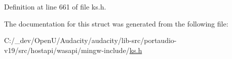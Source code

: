 Definition at line 661 of file ks.\+h.



The documentation for this struct was generated from the following file\+:\begin{DoxyCompactItemize}
\item 
C\+:/\+\_\+dev/\+Open\+U/\+Audacity/audacity/lib-\/src/portaudio-\/v19/src/hostapi/wasapi/mingw-\/include/\hyperlink{ks_8h}{ks.\+h}\end{DoxyCompactItemize}
